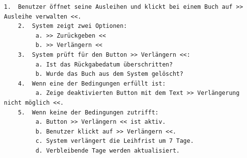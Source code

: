 \begin{lstlisting}[style=pseudocode, caption={Pseudocode für die Verlängerung einer Buchausleihe}, label={lst:extend-loan}]
	1.  Benutzer öffnet seine Ausleihen und klickt bei einem Buch auf >> Ausleihe verwalten <<.
	2.  System zeigt zwei Optionen:
	     a. >> Zurückgeben <<
	     b. >> Verlängern <<
	3.  System prüft für den Button >> Verlängern <<:
	     a. Ist das Rückgabedatum überschritten?
	     b. Wurde das Buch aus dem System gelöscht?
	4.  Wenn eine der Bedingungen erfüllt ist:
	     a. Zeige deaktivierten Button mit dem Text >> Verlängerung nicht möglich <<.
	5.  Wenn keine der Bedingungen zutrifft:
	     a. Button >> Verlängern << ist aktiv.
	     b. Benutzer klickt auf >> Verlängern <<.
	     c. System verlängert die Leihfrist um 7 Tage.
	     d. Verbleibende Tage werden aktualisiert.
\end{lstlisting}

























